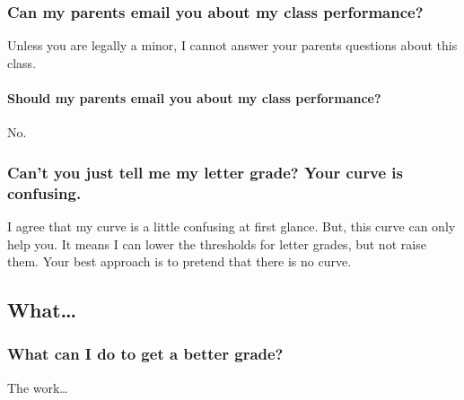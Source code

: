 \hypertarget{can-my-parents-email-you-about-my-class-performance}{%
\subsubsection{Can my parents email you about my class performance?}\label{can-my-parents-email-you-about-my-class-performance}}

Unless you are legally a minor, I cannot answer your parents questions about this class.

\hypertarget{should-my-parents-email-you-about-my-class-performance}{%
\paragraph{Should my parents email you about my class performance?}\label{should-my-parents-email-you-about-my-class-performance}}

No.

\hypertarget{cant-you-just-tell-me-my-letter-grade-your-curve-is-confusing.}{%
\subsubsection{Can't you just tell me my letter grade? Your curve is confusing.}\label{cant-you-just-tell-me-my-letter-grade-your-curve-is-confusing.}}

I agree that my curve is a little confusing at first glance.
But, this curve can only help you. It means I can lower the thresholds for letter grades, but not raise them.
Your best approach is to pretend that there is no curve.

\hypertarget{what}{%
\subsection{What\ldots{}}\label{what}}

\hypertarget{what-can-i-do-to-get-a-better-grade}{%
\subsubsection{What can I do to get a better grade?}\label{what-can-i-do-to-get-a-better-grade}}

The work\ldots{}

\begin{Shaded}
\begin{Highlighting}[]
\SpecialCharTok{::}\NormalTok{()) \{}
\NormalTok{(}\NormalTok{)}
\NormalTok{\}}\NormalTok{\{}
 \SpecialCharTok{\%\textgreater{}\%}
\NormalTok{() }\SpecialCharTok{\%\textgreater{}\%}
  \NormalTok{(}\NormalTok{)}
\NormalTok{\}}
\end{Highlighting}
\end{Shaded}

